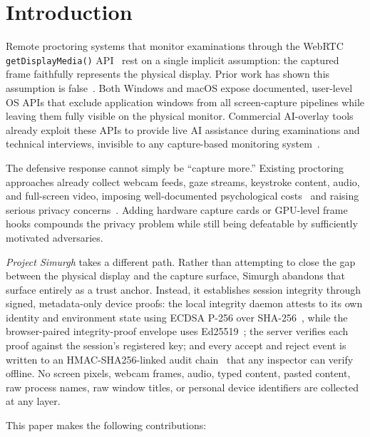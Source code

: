 \documentclass[conference]{IEEEtran}
\begin{document}
\section{Introduction}

Remote proctoring systems that monitor examinations through the WebRTC \texttt{getDisplayMedia()} API~\cite{bruaroey2025screen} rest on a single implicit assumption: the captured frame faithfully represents the physical display. Prior work has shown this assumption is false~\cite{abedini2026invisible}. Both Windows and macOS expose documented, user-level OS APIs that exclude application windows from all screen-capture pipelines while leaving them fully visible on the physical monitor. Commercial AI-overlay tools already exploit these APIs to provide live AI assistance during examinations and technical interviews, invisible to any capture-based monitoring system~\cite{cluely2025,interviewcoder2026,fabrichq2026cheating}.

The defensive response cannot simply be ``capture more.'' Existing proctoring approaches already collect webcam feeds, gaze streams, keystroke content, audio, and full-screen video, imposing well-documented psychological costs~\cite{conijn2022fear} and raising serious privacy concerns~\cite{paris2021sins,mukherjee2024balancing}. Adding hardware capture cards or GPU-level frame hooks compounds the privacy problem while still being defeatable by sufficiently motivated adversaries.

\textit{Project Simurgh} takes a different path. Rather than attempting to close the gap between the physical display and the capture surface, Simurgh abandons that surface entirely as a trust anchor. Instead, it establishes session integrity through signed, metadata-only device proofs: the local integrity daemon attests to its own identity and environment state using ECDSA P-256 over SHA-256~\cite{fips1865}, while the browser-paired integrity-proof envelope uses Ed25519~\cite{rfc8032}; the server verifies each proof against the session's registered key; and every accept and reject event is written to an HMAC-SHA256-linked audit chain~\cite{rfc2104} that any inspector can verify offline. No screen pixels, webcam frames, audio, typed content, pasted content, raw process names, raw window titles, or personal device identifiers are collected at any layer.

This paper makes the following contributions:
\end{document}
